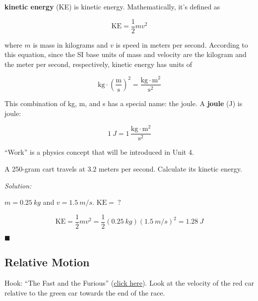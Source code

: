 \documentclass[dvipsnames]{article}
\begin{document}

\textbf{\Gls{kinetic energy}} (KE) is \glsdesc{kinetic energy}. Mathematically, it's defined as

\begin{equation*}
    \mathrm{KE} = \frac{1}{2} m v^2
\end{equation*}

where $m$ is mass in kilograms and $v$ is speed in meters per second. According to this equation, since the SI base units of mass and velocity are the kilogram and the meter per second, respectively, kinetic energy has units of

\begin{equation*}
    \mathrm{kg} \cdot \left(\mathrm{\frac{m}{s}}\right)^2 = \mathrm{\frac{kg\cdot m^2}{s^2}}
\end{equation*}

This combination of kg, m, and s has a special name: the joule. A \textbf{\gls{joule}} (J) is \glsdesc{joule}:

\begin{equation*}
    \SI{1}{J} = 1\,\mathrm{\frac{kg\cdot m^2}{s^2}}
\end{equation*}

``Work'' is a physics concept that will be introduced in Unit 4.

\begin{example}
A 250-gram cart travels at 3.2 meters per second. Calculate its kinetic energy. 
\end{example}

\textit{Solution:}

$m = \SI{0.25}{kg}$ and $v = \SI{1.5}{m/s}$. $\mathrm{KE} =\ ?$

\begin{equation*}
    \mathrm{KE} = \frac{1}{2} mv^2 = \frac{1}{2}(\SI{0.25}{kg})(\SI{1.5}{m/s})^2 = \boxed{\SI{1.28}{J}} 
\end{equation*}

\hfill $\blacksquare$


\subsection{Relative Motion}


Hook: ``The Fast and the Furious'' (\href{https://youtu.be/yWiSjVHCT30?feature=shared&t=238}{click here}). Look at the velocity of the red car relative to the green car towards the end of the race.

\end{document}
